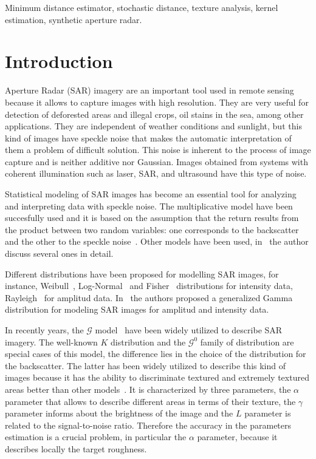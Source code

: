 \documentclass[journal]{IEEEtran}
\numberwithin{equation}{section}
\begin{document}
\begin{keywords}
Minimum distance estimator, stochastic distance, texture analysis, kernel estimation, synthetic aperture radar.
\end{keywords}

\IEEEpeerreviewmaketitle

\section{Introduction}
\label{intro}
 Aperture Radar (SAR) imagery are an important tool used in
remote sensing because it allows to capture images with high resolution. They are very useful for detection of deforested areas and illegal crops, oil stains in the sea, among other applications. They are independent of weather conditions and sunlight, but this kind of images have speckle noise that makes the automatic interpretation of them a problem of difficult solution. This noise is inherent to the process of image capture and is neither additive nor Gaussian. Images obtained from systems with coherent illumination such as laser, SAR, and ultrasound have this type of noise.

Statistical modeling of SAR images has become an essential tool for analyzing and interpreting data with speckle noise. The multiplicative model have been succesfully used and it is based on the assumption that the return results from the product between two random variables: one corresponds to the backscatter and the other to the speckle noise~\cite{oliverquegan98}. Other models have been used, in~\cite{Gao2010} the author discuss several ones in detail.

Different distributions have been proposed for modelling SAR images, for instance, Weibull~\cite{Oliver1993}, Log-Normal~\cite{oliverquegan98} and Fisher~\cite{Tupin2004} distributions for intensity data, Rayleigh~\cite{oliverquegan98} for amplitud data. In~\cite{Li2011} the authors proposed a generalized Gamma distribution for modeling SAR images for amplitud and intensity data.

In recently years, the $\mathcal G$ model~\cite{Frery97} have been widely utilized to describe SAR imagery. The well-known $K$ distribution and the $\mathcal G^0$ family of distribution are special cases of this model, the difference lies in the choice of the distribution for the backscatter.  The latter has been widely utilized to describe this kind of images because it has the ability to discriminate textured and extremely textured areas better than other models~\cite{MejailJacoboFreryBustos:IJRS}. It is characterized by three parameters, the $\alpha$ parameter that allows to describe different areas in terms of their texture, the $\gamma$ parameter informs about the brightness of the image and the $L$ parameter is related to the signal-to-noise ratio. Therefore the accuracy in the parameters estimation is a crucial problem, in particular the $\alpha$ parameter, because it describes locally the target roughness.
\end{document}

